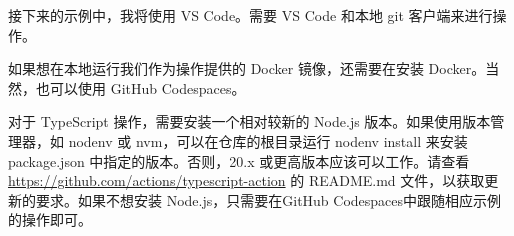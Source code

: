 
接下来的示例中，我将使用 VS Code。需要 VS Code 和本地 git 客户端来进行操作。

如果想在本地运行我们作为操作提供的 Docker 镜像，还需要在安装 Docker。当然，也可以使用 GitHub Codespaces。

对于 TypeScript 操作，需要安装一个相对较新的 Node.js 版本。如果使用版本管理器，如 nodenv 或 nvm，可以在仓库的根目录运行 nodenv install 来安装 package.json 中指定的版本。否则，20.x 或更高版本应该可以工作。请查看 \url{https://github.com/actions/typescript-action} 的 README.md 文件，以获取更新的要求。如果不想安装 Node.js，只需要在GitHub Codespaces中跟随相应示例的操作即可。